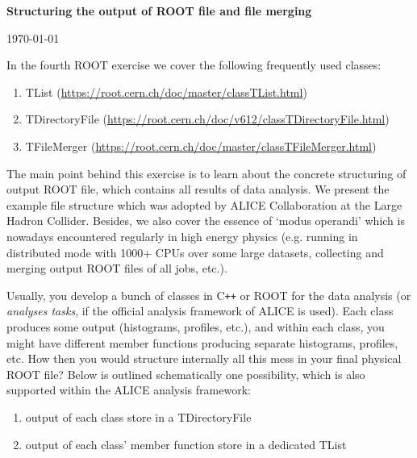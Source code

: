 \documentclass[11pt]{article}
\begin{document}
\begin{center}
\Large{\bf{Structuring the output of ROOT file and file merging}}\\
\end{center}
\begin{center}
{\small\today}
\end{center}

\bigskip

\noindent In the fourth ROOT exercise we cover the following frequently used classes:
%
\begin{enumerate}
\item TList (\url{https://root.cern.ch/doc/master/classTList.html})
\item TDirectoryFile (\url{https://root.cern.ch/doc/v612/classTDirectoryFile.html}) 
\item TFileMerger (\url{https://root.cern.ch/doc/master/classTFileMerger.html}) 
\end{enumerate}
%
\bigskip
\noindent The main point behind this exercise is to learn about the concrete structuring of output ROOT file, which contains all results of data analysis. We present the example file structure which was adopted by ALICE Collaboration at the Large Hadron Collider. Besides, we also cover the essence of `modus operandi' which is nowadays encountered regularly in high energy physics (e.g. running in distributed mode with 1000+ CPUs over some large datasets, collecting and merging output ROOT files of all jobs, etc.).

Usually, you develop a bunch of classes in C\texttt{++} or ROOT for the data analysis (or {\it analyses tasks}, if the official analysis framework of ALICE is used). Each class produces some output (histograms, profiles, etc.), and within each class, you might have different member functions producing separate histograms, profiles, etc. How then you would structure internally all this mess in your final physical ROOT file? Below is outlined schematically one possibility, which is also supported within the ALICE analysis framework:
%
\begin{enumerate}
\item output of each class store in a TDirectoryFile
\item output of each class' member function store in a dedicated TList
\end{enumerate}
\end{document}
